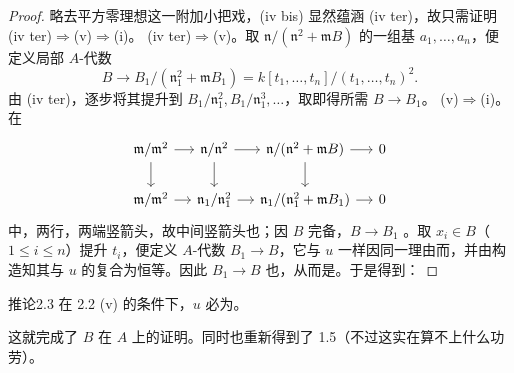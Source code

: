 \begin{proof}
略去平方零理想这一附加小把戏，(iv bis) 显然蕴涵 (iv ter)，故只需证明 (iv ter)$\Rightarrow$(v)$\Rightarrow$(i)。
(iv ter)$\Rightarrow$(v)。取 $\mathfrak n/(\mathfrak n^2+\mathfrak mB)$ 的一组基 $a_1,\ldots,a_n$，便定义局部 $A$-代数
\[B\to B_1/(\mathfrak n_1^2+\mathfrak mB_1)=k[t_1,\ldots,t_n]/(t_1,\ldots,t_n)^2.\]
由 (iv ter)，逐步将其提升到 $B_1/\mathfrak n_1^2,B_1/\mathfrak n_1^3,\ldots$，取即得所需 $B\to B_1$。
(v)$\Rightarrow$(i)。在
\[\begin{tikzcd}[column sep=small]
\mathfrak m/\mathfrak m^2\arrow[r]\arrow[d]&\mathfrak n/\mathfrak n^2\arrow[r]\arrow[d]&\mathfrak n/(\mathfrak n^2+\mathfrak mB)\arrow[r]\arrow[d]&0\\
\mathfrak m/\mathfrak m^2\arrow[r]&\mathfrak n_1/\mathfrak n_1^2\arrow[r]&\mathfrak n_1/(\mathfrak n_1^2+\mathfrak mB_1)\arrow[r]&0
\end{tikzcd}\]
中，两行，两端竖箭头，故中间竖箭头也；因 $B$ 完备，$B\to B_1$ 。取 $x_i\in B$（$1\leq i\leq n$）提升 $t_i$，便定义 $A$-代数 $B_1\to B$，它与 $u$ 一样因同一理由而，并由构造知其与 $u$ 的复合为恒等。因此 $B_1\to B$ 也，从而是。于是得到：
\end{proof}
\begin{SGAresult}{推论}{2.3}
在 2.2 (v) 的条件下，$u$ 必为。
\end{SGAresult}
这就完成了 $B$ 在 $A$ 上的证明。同时也重新得到了 1.5（不过这实在算不上什么功劳）。
